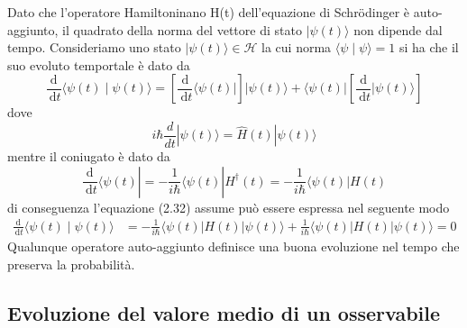 Dato che l'operatore Hamiltoninano H(t) dell'equazione di Schr\"odinger \`e auto-aggiunto, il quadrato della norma del vettore di stato $|\psi(t) \rangle $ non dipende dal tempo. Consideriamo uno stato $|\psi(t) \rangle \in \mathcal{H}$ la cui norma $\langle \psi \mid \psi \rangle = 1$ si ha che il suo evoluto temportale \`e dato da  
\begin{equation}
	\frac{\mathrm{d}}{\mathrm{~d} t}\langle\psi(t) \mid \psi(t)\rangle=\left[\frac{\mathrm{d}}{\mathrm{~d} t}\langle\psi(t)|\right]|\psi(t)\rangle+\langle\psi(t)|\left[\frac{\mathrm{d}}{\mathrm{~d} t}|\psi(t)\rangle\right]
\end{equation}
dove 
\begin{equation*}
	i \hbar \frac{d}{dt}|\psi(t) \rangle  = \hat{H}(t) |\psi(t) \rangle  
\end{equation*}
mentre il coniugato \`e dato da
\begin{equation*}
	\frac{\mathrm{d}}{\mathrm{~d} t}\langle\psi(t)|=-\frac{1}{i \hbar}\langle\psi(t)| H^{\dagger}(t)=-\frac{1}{i \hbar}\langle\psi(t)| H(t)
\end{equation*}
di conseguenza l'equazione (2.32) assume pu\`o essere espressa nel seguente modo
\begin{equation*}
\begin{aligned}
\frac{\mathrm{d}}{\mathrm{~d} t}\langle\psi(t) \mid \psi(t)\rangle & =-\frac{1}{i \hbar}\langle\psi(t)| H(t)|\psi(t)\rangle+\frac{1}{i \hbar}\langle\psi(t)| H(t)|\psi(t)\rangle =0
\end{aligned}
\end{equation*}
Qualunque operatore auto-aggiunto definisce una buona evoluzione nel tempo che preserva la probabilit\`a.

\subsection{Evoluzione del valore medio di un osservabile}

